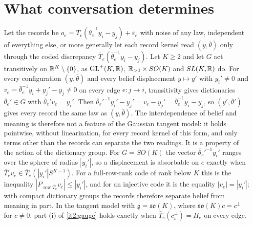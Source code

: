 \section{What conversation determines}
\label{it2:ch-identification}

Let the records be $o_e=\bar T_e(\bar\theta_e^{-1}y_i-y_j)+\varepsilon_e$ with noise of any law, independent of everything else, or more generally let each record kernel read $(y,\bar\theta)$ only through the coded discrepancy $\bar T_e(\bar\theta_e^{-1}y_i-y_j)$. Let $K\geq2$ and let $G$ act transitively on $\mathbb R^K\setminus\{0\}$, as $\mathrm{GL}^+(K,\mathbb R)$, $\mathbb R_{>0}\times SO(K)$ and $SL(K,\mathbb R)$ do. For every configuration $(y,\bar\theta)$ and every belief displacement $y\mapsto y'$ with $y_i'\neq0$ and $v_e=\bar\theta_e^{-1}y_i+y_j'-y_j\neq0$ on every edge $e:j\to i$, transitivity gives dictionaries $\bar\theta_e'\in G$ with $\bar\theta_e'v_e=y_i'$. Then $\bar\theta_e'^{-1}y_i'-y_j'=v_e-y_j'=\bar\theta_e^{-1}y_i-y_j$, so $(y',\bar\theta')$ gives every record the same law as $(y,\bar\theta)$. The interdependence of belief and meaning is therefore not a feature of the Gaussian tangent model: it holds pointwise, without linearization, for every record kernel of this form, and only terms other than the records can separate the two readings. It is a property of the action of the dictionary group. For $G=SO(K)$ the vector $\bar\theta_e'^{-1}y_i'$ ranges over the sphere of radius $|y_i'|$, so a displacement is absorbable on $e$ exactly when $\bar T_ev_e\in\bar T_e(|y_i'|S^{K-1})$. For a full-row-rank code of rank below $K$ this is the inequality $|P_{\operatorname{row}\bar T_e}v_e|\leq|y_i'|$, and for an injective code it is the equality $|v_e|=|y_i'|$; with compact dictionary groups the records therefore separate belief from meaning in part. In the tangent model with $\mathfrak g=\mathfrak{so}(K)$, where $\mathfrak{so}(K)c=c^\perp$ for $c\neq0$, part (i) of \cref{it2:gauge} holds exactly when $\bar T_e(c_i^\perp)=H_e$ on every edge.

